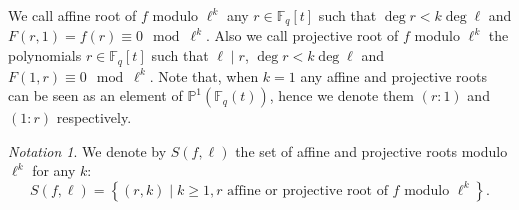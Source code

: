 \documentclass[a4wide]{article}
\newcommand{\F}{{\mathbb F}}
\theoremstyle{plain}
\theoremstyle{definition}
\theoremstyle{remark}
\newtheorem{nott}[theo]{Notation}
\begin{document}
We call affine root of $f$ modulo $\ell^k$ any $r\in \F_q[t]$ such that
$\deg r< k \deg \ell$ and $F(r,1)=f(r)\equiv 0\mod \ell^k$. Also we call
projective root of $f$ modulo $\ell^k$ the polynomials $r\in\F_q[t]$ such
that $\ell \mid r$, $\deg r< k \deg\ell$ and $F(1,r)\equiv 0\mod \ell^k$.
Note that, when $k=1$ any affine and projective roots can be seen as
an element of $\mathbb{P}^1(\F_q(t))$, hence we denote them $(r:1)$ and
$(1:r)$ respectively. 

\begin{nott} We denote by $S(f,\ell)$ the set of affine and projective
    roots modulo $\ell^k$ for any $k$:
	\begin{equation}\label{S}
		S(f,\ell)=\left\{(r,k)\mid k\geq 1, r\text{ affine or
			projective root of $f$ modulo }\ell^k \right\}.
\end{equation}
\end{nott}
\end{document}
